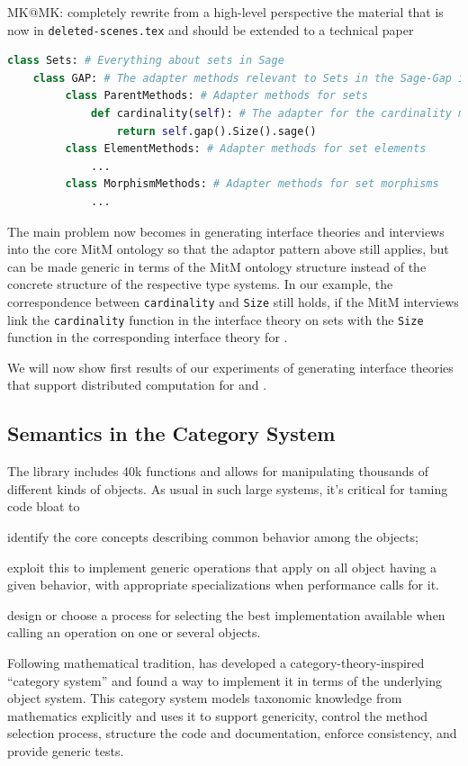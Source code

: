 \begin{newpart}{MK@MK: completely rewrite from a high-level perspective the material that
    is now in \texttt{deleted-scenes.tex} and should be extended to a technical paper}
\begin{lstlisting}[language=Python,label=lst:adaptor,
  caption=A Semantic Adaptor Mehthod in \Sage]
class Sets: # Everything about sets in Sage
    class GAP: # The adapter methods relevant to Sets in the Sage-Gap interface
         class ParentMethods: # Adapter methods for sets
             def cardinality(self): # The adapter for the cardinality method
                 return self.gap().Size().sage()
         class ElementMethods: # Adapter methods for set elements
             ...
         class MorphismMethods: # Adapter methods for set morphisms
             ...
\end{lstlisting}
The main problem now becomes in generating interface theories and interviews into the core
MitM ontology so that the adaptor pattern above still applies, but can be made generic in
terms of the MitM ontology structure instead of the concrete structure of the respective
type systems. In our example, the correspondence between \texttt{cardinality} and
\texttt{Size} still holds, if the MitM interviews link the \texttt{cardinality} function
in the \Sage interface theory on sets with the \texttt{Size} function in the corresponding
interface theory for \GAP.

We will now show first results of our experiments of generating interface theories that
support distributed computation for \Sage and \GAP. 
\end{newpart}

\subsection{Semantics in the \Sage Category System}

The \Sage library includes 40k functions and allows for manipulating thousands of
different kinds of objects. As usual in such large systems, it’s critical for taming code
bloat to
\begin{inparaenum}[\em i\rm)]
\item identify the core concepts describing common behavior among the objects; 
\item exploit this to implement generic operations that apply on all object having a given
  behavior, with appropriate specializations when performance calls for it.  
\item design or choose a process for selecting the best implementation available when
  calling an operation on one or several objects.
\end{inparaenum}
Following mathematical tradition, \Sage has developed a category-theory-inspired
``category system'' and found a way to implement it in terms of the underlying \Python
object system. This category system models
taxonomic knowledge from mathematics explicitly and uses it to support genericity, control
the method selection process, structure the code and documentation, enforce consistency,
and provide generic tests.

